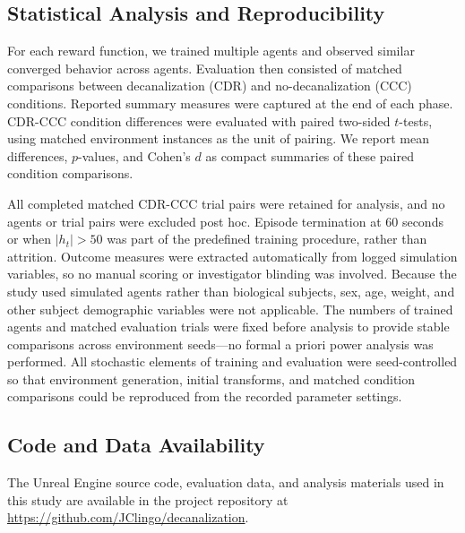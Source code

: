 \subsection{Statistical Analysis and Reproducibility}

For each reward function, we trained multiple agents and observed similar converged behavior across agents. Evaluation then consisted of matched comparisons between decanalization (CDR) and no-decanalization (CCC) conditions. Reported summary measures were captured at the end of each phase. CDR-CCC condition differences were evaluated with paired two-sided $t$-tests, using matched environment instances as the unit of pairing. We report mean differences, $p$-values, and Cohen's $d$ as compact summaries of these paired condition comparisons.

All completed matched CDR-CCC trial pairs were retained for analysis, and no agents or trial pairs were excluded post hoc. Episode termination at 60 seconds or when \(|h_t| > 50\) was part of the predefined training procedure, rather than attrition. Outcome measures were extracted automatically from logged simulation variables, so no manual scoring or investigator blinding was involved. Because the study used simulated agents rather than biological subjects, sex, age, weight, and other subject demographic variables were not applicable. The numbers of trained agents and matched evaluation trials were fixed before analysis to provide stable comparisons across environment seeds—no formal a priori power analysis was performed. All stochastic elements of training and evaluation were seed-controlled so that environment generation, initial transforms, and matched condition comparisons could be reproduced from the recorded parameter settings.

\subsection{Code and Data Availability}

The Unreal Engine source code, evaluation data, and analysis materials used in this study are available in the project repository at \url{https://github.com/JClingo/decanalization}.


